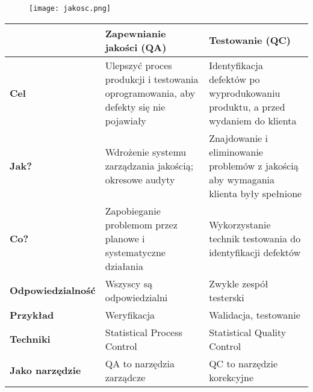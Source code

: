 \documentclass[../main.tex]{subfiles}
\begin{document}
    \begin{figure}[H]
        \texttt{[image: jakosc.png]}
    \end{figure}


    \begin{table}[H]
        \begin{center}
            \begin{tabular}{| p{3cm} || p{6cm} | p{6cm} |}
                \hline
                & \textbf{Zapewnianie jakości (QA)} & \textbf{Testowanie (QC)}\\
                \hline
                \hline
                \textbf{Cel} & Ulepszyć proces produkcji i testowania oprogramowania,
                aby defekty się nie pojawiały & Identyfikacja defektów po wyprodukowaniu produktu,
                a przed wydaniem do klienta\\
                \hline
                \textbf{Jak?} & Wdrożenie systemu zarządzania jakością; okresowe audyty &
                Znajdowanie i eliminowanie problemów z jakością aby wymagania klienta były spełnione\\
                \hline
                \textbf{Co?} & Zapobieganie problemom przez planowe i systematyczne działania
                & Wykorzystanie technik testowania do identyfikacji defektów\\
                \hline
                \textbf{Odpowiedzialność} & Wszyscy są odpowiedzialni & Zwykle zespół testerski\\
                \hline
                \textbf{Przykład} & Weryfikacja & Walidacja, testowanie\\
                \hline
                \textbf{Techniki} & Statistical Process Control & Statistical Quality Control\\
                \hline
                \textbf{Jako narzędzie} & QA to narzędzia zarządcze & QC to narzędzie korekcyjne\\
                \hline
            \end{tabular}
        \end{center}
    \end{table}
\end{document}
